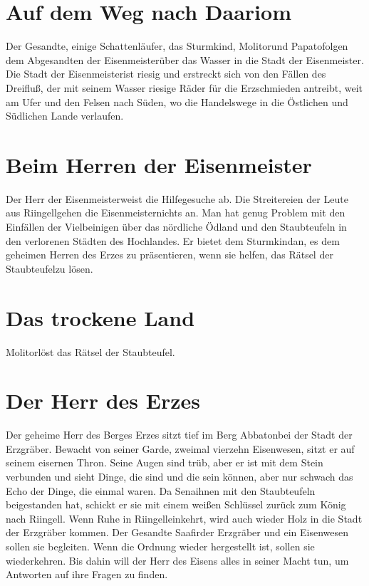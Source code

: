\documentclass[12pt,a4paper,onecolumn,twoside,ngerman]{book}
\newcommand{\Molitor}{Molitor}
\newcommand{\Sena}{Sena}
\newcommand{\Sturmkind}{Sturmkind}
\newcommand{\Papato}{Papato}
\newcommand{\Schattenlaufer}{Schattenläufer}
\newcommand{\Rhingell}{Riingell}
\newcommand{\Dreifluss}{Dreifluß}
\newcommand{\Eisenmeister}{Eisenmeister}
\newcommand{\Dariom}{Daariom}
\newcommand{\Abaton}{Abbaton}
\newcommand{\Safir}{Saafir}
\newcommand{\Staubteufel}{Staubteufel}
\begin{document}
\section{Auf dem Weg nach \Dariom}
Der Gesandte, einige \Schattenlaufer , das \Sturmkind , \Molitor  und \Papato  folgen dem Abgesandten der \Eisenmeister  über das Wasser in die Stadt der \Eisenmeister .
Die Stadt der \Eisenmeister ist riesig und erstreckt sich von den Fällen des \Dreifluss , der mit seinem Wasser riesige Räder für die Erzschmieden antreibt, weit am Ufer und den Felsen nach Süden, wo die Handelswege in die Östlichen und Südlichen Lande verlaufen.

\section{Beim Herren der \Eisenmeister}
Der Herr der \Eisenmeister  weist die Hilfegesuche ab. Die Streitereien der Leute aus \Rhingell  gehen die \Eisenmeister  nichts an. Man hat genug Problem mit den Einfällen der Vielbeinigen über das nördliche Ödland und den \Staubteufel n in den verlorenen Städten des Hochlandes. 
Er bietet dem \Sturmkind an, es dem geheimen Herren des Erzes zu präsentieren, wenn sie helfen, das Rätsel der \Staubteufel zu lösen.

\section{Das trockene Land}
\Molitor löst das Rätsel der \Staubteufel .

\section{Der Herr des Erzes}
Der geheime Herr des Berges Erzes sitzt tief im Berg \Abaton bei der Stadt der Erzgräber. Bewacht von seiner Garde, zweimal vierzehn Eisenwesen, sitzt er auf seinem eisernen Thron. Seine Augen sind trüb, aber er ist mit dem Stein verbunden und sieht Dinge, die sind und die sein können, aber nur schwach das Echo der Dinge, die einmal waren. 
Da \Sena ihnen mit den Staubteufeln beigestanden hat, schickt er sie mit einem weißen Schlüssel zurück zum König nach \Rhingell . Wenn Ruhe in \Rhingell einkehrt, wird auch wieder Holz in die Stadt der Erzgräber kommen. Der Gesandte \Safir der Erzgräber und ein Eisenwesen sollen sie begleiten. Wenn die Ordnung wieder hergestellt ist, sollen sie wiederkehren. Bis dahin will der Herr des Eisens alles in seiner Macht tun, um Antworten auf ihre Fragen zu finden.
\end{document}
